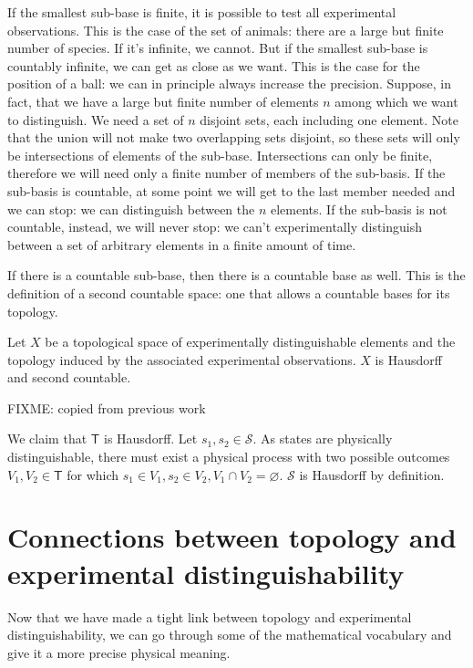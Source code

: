 \documentclass[11pt,letterpaper,fleqn]{memoir} %
\begin{document}
If the smallest sub-base is finite, it is possible to test all experimental observations. This is the case of the set of animals: there are a large but finite number of species. If it's infinite, we cannot. But if the smallest sub-base is countably infinite, we can get as close as we want. This is the case for the position of a ball: we can in principle always increase the precision. Suppose, in fact, that we have a large but finite number of elements $n$ among which we want to distinguish. We need a set of $n$ disjoint sets, each including one element. Note that the union will not make two overlapping sets disjoint, so these sets will only be intersections of elements of the sub-base. Intersections can only be finite, therefore we will need only a finite number of members of the sub-basis. If the sub-basis is countable, at some point we will get to the last member needed and we can stop: we can distinguish between the $n$ elements. If the sub-basis is not countable, instead, we will never stop: we can't experimentally distinguish between a set of arbitrary elements in a finite amount of time.

If there is a countable sub-base, then there is a countable base as well. This is the definition of a second countable space: one that allows a countable bases for its topology.

\begin{prop}
	Let $X$ be a topological space of experimentally distinguishable elements and the topology induced by the associated experimental observations. $X$ is Hausdorff and second countable.
\end{prop}

\begin{justification}
	FIXME: copied from previous work
	
	We claim that $\mathsf{T}$ is Hausdorff. Let $s_1, s_2 \in \mathcal{S}$. As states are physically distinguishable, there must exist a physical process with two possible outcomes $V_1, V_2 \in \mathsf{T}$ for which $s_1 \in V_1, s_2 \in V_2, V_1 \cap V_2 = \varnothing$. $\mathcal{S}$ is Hausdorff by definition.
\end{justification}

\section{Connections between topology and experimental distinguishability}

Now that we have made a tight link between topology and experimental distinguishability, we can go through some of the mathematical vocabulary and give it a more precise physical meaning.
\end{document}

